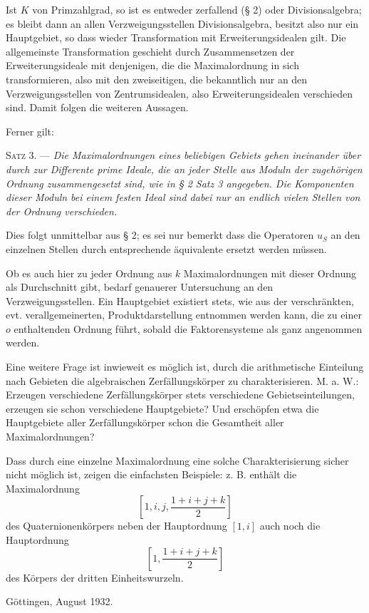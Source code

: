 Ist $K$ von Primzahlgrad, so ist es entweder zerfallend (§ 2) oder Divisionsalgebra; es bleibt dann an allen Verzweigungsstellen Divisionsalgebra, besitzt also nur ein Hauptgebiet, so dass wieder Transformation mit Erweiterungsidealen gilt. Die allgemeinste Transformation geschieht durch Zusammensetzen der Erweiterungsideale mit denjenigen, die die Maximalordnung in sich transformieren, also mit den zweiseitigen, die bekanntlich nur an den Verzweigungsstellen von Zentrumsidealen, also Erweiterungsidealen verschieden sind. Damit folgen die weiteren Aussagen.

Ferner gilt:

\medskip
\noindent\textsc{Satz 3. ---} \emph{Die Maximalordnungen eines beliebigen Gebiets gehen ineinander über durch zur Differente prime Ideale, die an jeder Stelle aus Moduln der zugehörigen Ordnung zusammengesetzt sind, wie in § 2 Satz 3 angegeben. Die Komponenten dieser Moduln bei einem festen Ideal sind dabei nur an endlich vielen Stellen von der Ordnung verschieden.}

Dies folgt unmittelbar aus § 2; es sei nur bemerkt dass die Operatoren $u_S$ an den einzelnen Stellen durch entsprechende äquivalente ersetzt werden müssen.

Ob es auch hier zu jeder Ordnung aus $k$ Maximalordnungen mit dieser Ordnung als Durchschnitt gibt, bedarf genauerer Untersuchung an den Verzweigungsstellen. Ein Hauptgebiet existiert stets, wie aus der verschränkten, evt. verallgemeinerten, Produktdarstellung entnommen werden kann, die zu einer $o$ enthaltenden Ordnung führt, sobald die Faktorensysteme als ganz angenommen werden.

Eine weitere Frage ist inwieweit es möglich ist, durch die arithmetische Einteilung nach Gebieten die algebraischen Zerfällungskörper zu charakterisieren. M. a. W.: Erzeugen verschiedene Zerfällungskörper stets verschiedene Gebietseinteilungen, erzeugen sie schon verschiedene Hauptgebiete? Und erschöpfen etwa die Hauptgebiete aller Zerfällungskörper schon die Gesamtheit aller Maximalordnungen?

Dass durch eine einzelne Maximalordnung eine solche Charakterisierung sicher nicht möglich ist, zeigen die einfachsten Beispiele: z. B. enthält die Maximalordnung
\[
\left[1,i,j,\frac{1+i+j+k}{2}\right]
\]
des Quaternionenkörpers neben der Hauptordnung $[1,i]$ auch noch die Hauptordnung
\[
\left[1,\frac{1+i+j+k}{2}\right]
\]
des Körpers der dritten Einheitswurzeln.

\begin{flushleft}
Göttingen, August 1932.
\end{flushleft}

\clearpage


